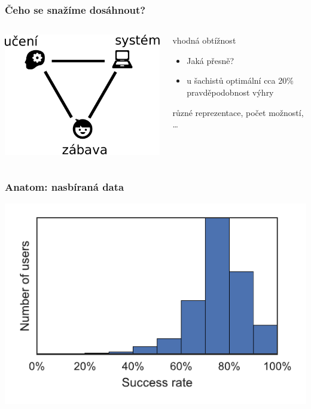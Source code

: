\documentclass[xcolor=svgnames]{beamer}
\begin{document}
\begin{frame}
	\frametitle{Čeho se snažíme dosáhnout?}
	\begin{columns}
		\begin{column}{.4\textwidth}
			\begin{center}
				\includegraphics[width=\textwidth]{img/balance}
			\end{center}
		\end{column}
		\begin{column}{.6\textwidth}
			\pause
			vhodná obtížnost
			\begin{itemize}
				\item Jaká přesně?
				\item u šachistů optimální cca 20\% pravděpodobnost výhry
			\end{itemize}
			různé reprezentace, počet možností, \ldots
		\end{column}
	\end{columns}
\end{frame}
\begin{frame}
	\frametitle{Anatom: nasbíraná data}
	\includegraphics[width=\textwidth]{img/user_success_hist}
\end{frame}
\end{document}
